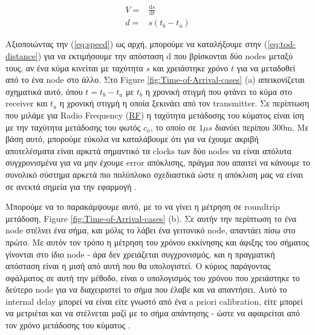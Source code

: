 \begin{align}
	V=&\frac{\mathrm{d}s}{\mathrm{d}t} \label{eq:speed} \\
	d=&s(t_b-t_a) \label{eq:tod-distance}
\end{align}

Αξιοποιώντας την (\ref{eq:speed}) ως αρχή, μπορούμε να καταλήξουμε στην (\ref{eq:tod-distance}) για να εκτιμήσουμε
την απόσταση d που βρίσκονται δύο nodes μεταξύ τους, αν ένα κύμα κινείται με ταχύτητα $s$ και χρειάστηκε 
χρόνο $t$ για να μεταδοθεί από το ένα node στο άλλο. Στο Figure \ref{fig:Time-of-Arrival-cases} (a) απεικονίζεται
σχηματικά αυτό, όπου $t=t_b-t_a$ με $t_b$ η χρονική στιγμή που φτάνει το κύμα στο receiver και $t_a$
η χρονική στιγμή η οποία ξεκινάει από τον transmitter. Σε περίπτωση που μιλάμε για Radio Frequency 
(\hyperref[abbr:RF]{RF}) η ταχύτητα μετάδοσης του κύματος είναι ίση με την ταχύτητα μετάδοσης του φωτός $c_o$, το οποίο 
σε $1μs$ διανύει περίπου 300m.
Με βάση αυτό, μπορούμε εύκολα να καταλάβουμε ότι για να έχουμε ακριβή αποτελέσματα είναι αρκετά σημαντικό
τα clocks των δύο nodes να είναι απόλυτα συγχρονισμένα για να μην έχουμε error απόκλισης, πράγμα που
απαιτεί να κάνουμε το συνολικό σύστημα αρκετά πιο πολύπλοκο σχεδιαστικά 
ώστε η απόκλιση μας να είναι σε ανεκτά σημεία για την εφαρμογή \cite{wsn-Localization-systems} \cite{wsn-Localization-techniques}.

Μπορούμε να το παρακάμψουμε αυτό, με το να γίνει η μέτρηση σε roundtrip μετάδοση, Figure \ref{fig:Time-of-Arrival-cases} (b).
Σε αυτήν την περίπτωση το ένα node στέλνει ένα σήμα, και μόλις το λάβει ένα γειτονικό node, απαντάει πίσω στο πρώτο. 
Με αυτόν τον τρόπο η μέτρηση του χρόνου εκκίνησης και άφιξης του σήματος γίνονται στο ίδιο node - 
άρα δεν χρειάζεται συγχρονισμός, και η πραγματική απόσταση είναι η μισή από αυτή που θα υπολογιστεί. Ο κύριος παράγοντας
σφάλματος σε αυτή την μέθοδο, είναι ο υπολογισμός του χρόνου που χρειάστηκε το δεύτερο node για να διαχειριστεί
το σήμα που έλαβε και να απαντήσει. Αυτό το internal delay μπορεί να είναι είτε γνωστό από 
ένα a priori calibration, είτε μπορεί να μετριέται και να στέλνεται μαζί με το σήμα απάντησης - ώστε να αφαιρείται
από τον χρόνο μετάδοσης του κύματος \cite{wsn-Localization-techniques}.

